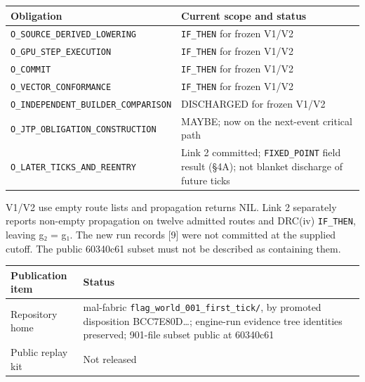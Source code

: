 \documentclass[
]{article}
\newcounter{none} %
\begin{document}
{\def\LTcaptype{none} %
\begin{longtable}[]{@{}
  >{\raggedright\arraybackslash}p{}
  >{\raggedright\arraybackslash}p{}@{}}
\toprule\noalign{}
\begin{minipage}[b]{\linewidth}\raggedright
\textbf{Obligation}
\end{minipage} & \begin{minipage}[b]{\linewidth}\raggedright
\textbf{Current scope and status}
\end{minipage} \\
\midrule\noalign{}
\endhead
\bottomrule\noalign{}
\endlastfoot
\nolinkurl{O_SOURCE_DERIVED_LOWERING} & \nolinkurl{IF_THEN} for frozen
V1/V2 \\
\nolinkurl{O_GPU_STEP_EXECUTION} & \nolinkurl{IF_THEN} for frozen
V1/V2 \\
\nolinkurl{O_COMMIT} & \nolinkurl{IF_THEN} for frozen V1/V2 \\
\nolinkurl{O_VECTOR_CONFORMANCE} & \nolinkurl{IF_THEN} for frozen
V1/V2 \\
\nolinkurl{O_INDEPENDENT_BUILDER_COMPARISON} & DISCHARGED for frozen
V1/V2 \\
\nolinkurl{O_JTP_OBLIGATION_CONSTRUCTION} & MAYBE; now on the next-event
critical path \\
\nolinkurl{O_LATER_TICKS_AND_REENTRY} & Link 2 committed;
\nolinkurl{FIXED_POINT} field result (§4A); not blanket discharge of
future ticks \\
\end{longtable}
}

V1/V2 use empty route lists and propagation returns NIL. Link 2
separately reports non-empty propagation on twelve admitted routes and
DRC(iv) \nolinkurl{IF_THEN}, leaving g₂ = g₁. The new run records
{[}9{]} were not committed at the supplied cutoff. The public 60340c61
subset must not be described as containing them.

{\def\LTcaptype{none} %
\begin{longtable}[]{@{}
  >{\raggedright\arraybackslash}p{}
  >{\raggedright\arraybackslash}p{}@{}}
\toprule\noalign{}
\begin{minipage}[b]{\linewidth}\raggedright
\textbf{Publication item}
\end{minipage} & \begin{minipage}[b]{\linewidth}\raggedright
\textbf{Status}
\end{minipage} \\
\midrule\noalign{}
\endhead
\bottomrule\noalign{}
\endlastfoot
Repository home & mal-fabric \nolinkurl{flag_world_001_first_tick/}, by
promoted disposition BCC7E80D\ldots; engine-run evidence tree identities
preserved; 901-file subset public at 60340c61 \\
Public replay kit & Not released \\
\end{longtable}
}
\end{document}
